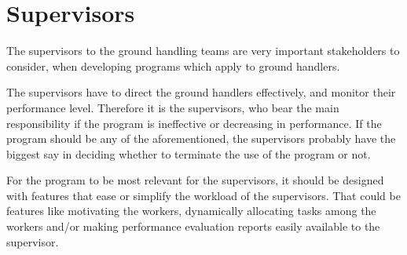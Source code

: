 \section{Supervisors}
The supervisors to the ground handling teams are very important stakeholders to consider, when developing programs which apply to ground handlers.

The supervisors have to direct the ground handlers effectively, and monitor their performance level. Therefore it is the supervisors, who bear the main responsibility if the program is ineffective or decreasing in performance. If the program should be any of the aforementioned, the supervisors probably have the biggest say in deciding whether to terminate the use of the program or not.

For the program to be most relevant for the supervisors, it should be designed with features that ease or simplify the workload of the supervisors. That could be features like motivating the workers, dynamically allocating tasks among the workers and/or making performance evaluation reports easily available to the supervisor.